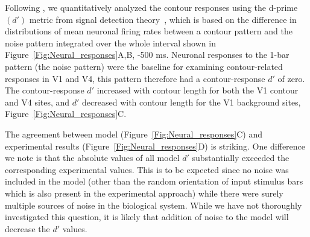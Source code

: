 {%
%

Following \cite{Chen_etal14}, 
we quantitatively analyzed the contour responses using the d-prime
$(d')$ metric from signal detection theory~\citep{Green_Swets66}, which
is based on the difference in distributions of mean neuronal firing
rates between a contour pattern and the noise pattern integrated over
the whole interval shown in Figure~\ref{Fig:Neural_responses}A,B, -500 ms.  Neuronal responses to the 1-bar pattern (the noise pattern)
were the baseline for examining contour-related responses in V1 and
V4, this pattern therefore had a contour-response $d'$ of zero. The
contour-response $d'$ increased with contour length for both the V1
contour and V4 sites, and $d'$ decreased with contour length for the V1
background sites, Figure~\ref{Fig:Neural_responses}C.

The agreement between model (Figure~\ref{Fig:Neural_responses}C) and
experimental results (Figure~\ref{Fig:Neural_responses}D) is striking.
One difference we note is that the absolute values of all model $d'$
substantially 
exceeded the corresponding experimental values. 
This is to be expected since
no noise was included in the model (other than the random orientation of input
stimulus bars which is also present in the experimental approach)
while there were surely multiple sources of noise in the biological
system. While we have not thoroughly investigated this question, it is
likely that addition of noise to the model will decrease the $d'$
values.

}
